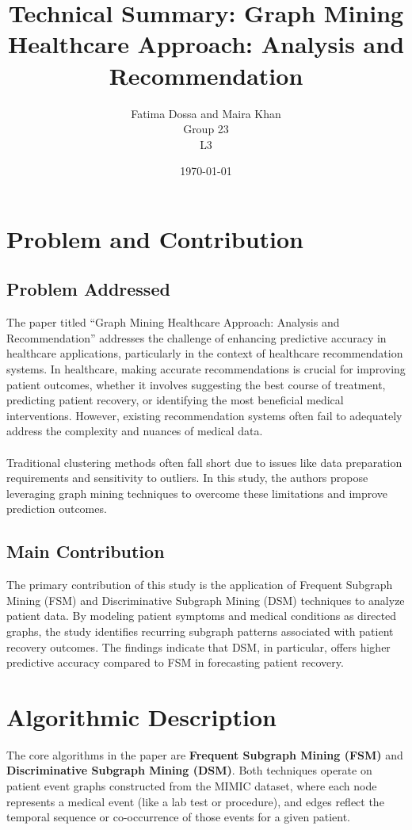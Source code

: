 \documentclass[12pt]{article}
\title{Technical Summary: Graph Mining Healthcare Approach: Analysis and Recommendation}
\author{Fatima Dossa and Maira Khan \\ Group 23  \\ L3}
\date{\today}
\begin{document}
\maketitle

\section{Problem and Contribution}

\subsection*{Problem Addressed}
The paper titled “Graph Mining Healthcare Approach: Analysis and Recommendation” addresses the challenge of enhancing predictive accuracy in healthcare applications, particularly in the context of healthcare recommendation systems. In healthcare, making accurate recommendations is crucial for improving patient outcomes, whether it involves suggesting the best course of treatment, predicting patient recovery, or identifying the most beneficial medical interventions. However, existing recommendation systems often fail to adequately address the complexity and nuances of medical data.\\ \\ Traditional clustering methods often fall short due to issues like data preparation requirements and sensitivity to outliers. In this study, the authors propose leveraging graph mining techniques to overcome these limitations and improve prediction outcomes.

\subsection*{Main Contribution}
The primary contribution of this study is the application of Frequent Subgraph Mining (FSM) and Discriminative Subgraph Mining (DSM) techniques to analyze patient data. By modeling patient symptoms and medical conditions as directed graphs, the study identifies recurring subgraph patterns associated with patient recovery outcomes. The findings indicate that DSM, in particular, offers higher predictive accuracy compared to FSM in forecasting patient recovery.

\section{Algorithmic Description}

The core algorithms in the paper are \textbf{Frequent Subgraph Mining (FSM)} and \textbf{Discriminative Subgraph Mining (DSM)}. Both techniques operate on patient event graphs constructed from the MIMIC dataset, where each node represents a medical event (like a lab test or procedure), and edges reflect the temporal sequence or co-occurrence of those events for a given patient.
\end{document}
